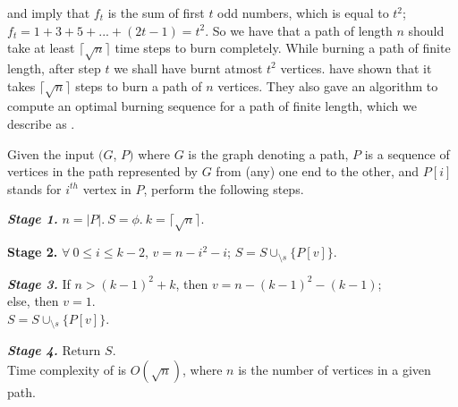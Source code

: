  and  imply that $f_t$ is the sum of first $t$ odd numbers, which is equal to $t^2$; $f_t = 1 + 3 + 5 + . . . + (2t-1) = t^2$. So we have that a path of length $n$ should take at least $\big\lceil\sqrt{n}\big\rceil$ time steps to burn completely. While burning a path of finite length, after step $t$ we shall have burnt atmost $t^2$ vertices. \cite{Bonato2016} have shown that it takes $\big\lceil\sqrt{n}\big\rceil$ steps to burn a path of $n$ vertices. They also gave an algorithm to compute an optimal burning sequence for a path of finite length, which we describe as .

\begin{algorithm}\label{algorithm:burn-path-finite}
Given the input $(G$, $P)$ where $G$ is the graph denoting a path, $P$ is a sequence of vertices in the path represented by $G$ from (any) one end to the other, and $P[i]$ stands for $i^{th}$ vertex in $P$, perform the following steps.
\end{algorithm}

\textbf{\textit{Stage 1.}} $n=|P|.\ S=\phi.\ k=\big\lceil\sqrt{n}\big\rceil$.

\textbf{\textbf{Stage 2.}} $\forall\ 0\leq i\leq k-2$, $v = n-i^2-i$; $S=S\cup_{\setminus s}\{P[v]\}$.

\textbf{\textit{Stage 3.}} If $n>(k-1)^2+k$, then $v = n-(k-1)^2-(k-1)$;\\
else, then $v=1$.\\
$S = S \cup_{\setminus s} \{P[v]\}$.

\textbf{\textit{Stage 4.}} Return $S$.\\

Time complexity of  is $O(\sqrt{n})$, where $n$ is the number of vertices in a given path. 

